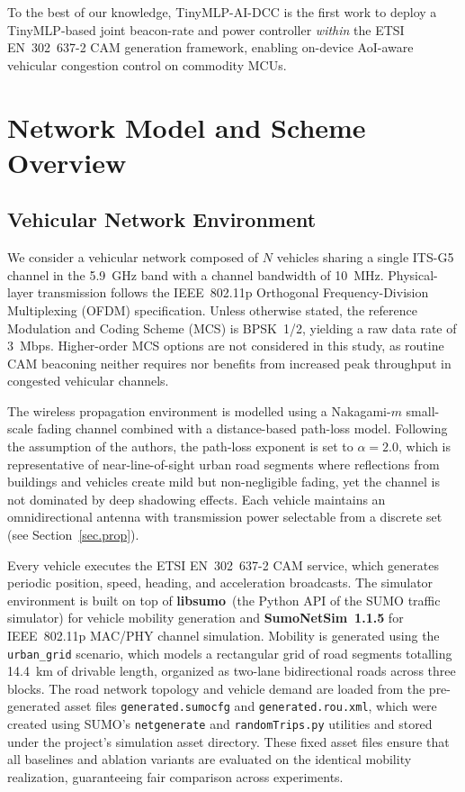 \documentclass[journal]{IEEEtran}
\begin{document}
\noindent
To the best of our knowledge, TinyMLP-AI-DCC is the first work to
deploy a TinyMLP-based joint beacon-rate and power controller
\emph{within} the ETSI EN~302~637-2 CAM generation framework, enabling
on-device AoI-aware vehicular congestion control on commodity MCUs.

\section{Network Model and Scheme Overview}
\label{sec.net}

\subsection{Vehicular Network Environment}
\label{subsec:net_env}

We consider a vehicular network composed of $N$ vehicles sharing a
single ITS-G5 channel in the 5.9~GHz band with a channel bandwidth of
10~MHz.  Physical-layer transmission follows the IEEE~802.11p
Orthogonal Frequency-Division Multiplexing (OFDM) specification.
Unless otherwise stated, the reference Modulation and Coding Scheme
(MCS) is BPSK~1/2, yielding a raw data rate of 3~Mbps.  Higher-order
MCS options are not considered in this study, as routine CAM beaconing
neither requires nor benefits from increased peak throughput in
congested vehicular channels.

The wireless propagation environment is modelled using a
Nakagami-$m$ small-scale fading channel combined with a distance-based
path-loss model.  Following the assumption of the authors, the path-loss
exponent is set to $\alpha = 2.0$, which is representative of
near-line-of-sight urban road segments where reflections from buildings
and vehicles create mild but non-negligible fading, yet the channel is
not dominated by deep shadowing effects.  Each vehicle maintains an
omnidirectional antenna with transmission power selectable from a
discrete set (see Section~\ref{sec.prop}).

Every vehicle executes the ETSI EN~302~637-2 CAM service, which
generates periodic position, speed, heading, and acceleration
broadcasts.  The simulator environment is built on top of
\textbf{libsumo}~(the Python API of the SUMO traffic simulator) for
vehicle mobility generation and \textbf{SumoNetSim~1.1.5} for
IEEE~802.11p MAC/PHY channel simulation.  Mobility is generated using
the \texttt{urban\_grid} scenario, which models a rectangular grid of
road segments totalling 14.4~km of drivable length, organized as
two-lane bidirectional roads across three blocks.  The road network
topology and vehicle demand are loaded from the pre-generated asset
files \texttt{generated.sumocfg} and \texttt{generated.rou.xml},
which were created using SUMO's \texttt{netgenerate} and
\texttt{randomTrips.py} utilities and stored under the project's
simulation asset directory.  These fixed asset files ensure that all
baselines and ablation variants are evaluated on the identical
mobility realization, guaranteeing fair comparison across experiments.
\end{document}
